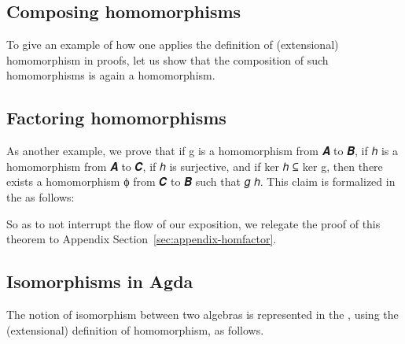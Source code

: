\documentclass[a4paper,USenglish,cleveref,autoref,thm-restate]{lipics-v2019}
\begin{document}
\subsection{Composing homomorphisms}
To give an example of how one applies the definition of (extensional) homomorphism in proofs, let us show that the composition of such homomorphisms is again a homomorphism.
\begin{code}\end{code}

\subsection{Factoring homomorphisms}
As another example, we prove that if \AB g is a homomorphism from \AB 𝑨 to \AB 𝑩, if \AB ℎ is a homomorphism from \AB 𝑨 to \AB 𝑪, if \AB ℎ is surjective, and if ker \AB ℎ ⊆ ker \AB g, then there exists a homomorphism \AB ϕ from \AB 𝑪 to \AB 𝑩 such that \AB 𝑔 \AS\AgdaSymbol{=}\AS{}\AS\AB ℎ.  This claim is formalized in the \agdaualib as follows:
\begin{code}\end{code}
So as to not interrupt the flow of our exposition, we relegate the proof of this theorem to Appendix Section~\ref{sec:appendix-homfactor}.

\subsection{Isomorphisms in Agda}\label{sec:isomorphism}
The notion of isomorphism between two algebras is represented in the \agdaualib, using the (extensional) definition of homomorphism, as follows.
\begin{code}\end{code}
\end{document}

